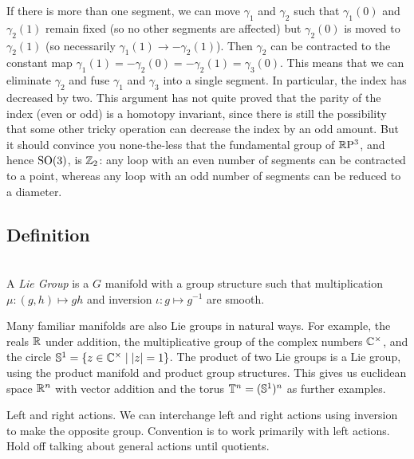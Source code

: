 If there is more than one segment, we can move $\gamma_1$ and $\gamma_2$ such that $\gamma_1(0)$ and $\gamma_2(1)$ remain fixed (so no other segments are affected) but $\gamma_2(0)$ is moved to $\gamma_2(1)$ (so necessarily $\gamma_1(1) \to - \gamma_2(1)$).
Then $\gamma_2$ can be contracted to the constant map $\gamma_1(1) = -\gamma_2(0) = -\gamma_2(1) = \gamma_3(0)$.
This means that we can eliminate $\gamma_2$ and fuse $\gamma_1$ and $\gamma_3$ into a single segment.
In particular, the index has decreased by two.
This argument has not quite proved that the parity of the index (even or odd) is a homotopy invariant, since there is still the possibility that some other tricky operation can decrease the index by an odd amount. 
But it should convince you none-the-less that the fundamental group of $\mathbb{R}\mathrm{P}^3$, and hence $\mathrm{SO}(3)$, is $\mathbb{Z}_2$:
any loop with an even number of segments can be contracted to a point, whereas any loop with an odd number of segments can be reduced to a diameter.


\subsection{Definition}

\begin{definition}
\textup{\cite[3.1]{Warner1983}\cite[Definition~1.20]{Hall2015}} \\
A \emph{Lie Group} is a $G$ manifold with a group structure such that multiplication $\mu : (g,h) \mapsto gh$ and inversion $\iota : g \mapsto g^{-1}$ are smooth.
\end{definition}

Many familiar manifolds are also Lie groups in natural ways.
For example, the reals $\mathbb{R}$ under addition, the multiplicative group of the complex numbers $\mathbb{C}^\times$, and the circle $\mathbb{S}^1 = \{ z \in \mathbb{C}^\times \mid |z| = 1 \}$.
The product of two Lie groups is a Lie group, using the product manifold and product group structures.
This gives us euclidean space $\mathbb{R}^n$ with vector addition and the torus $\mathbb{T}^n = (\mathbb{S}^1)^n$ as further examples.

Left and right actions.
We can interchange left and right actions using inversion to make the opposite group.
Convention is to work primarily with left actions.
Hold off talking about general actions until quotients.

